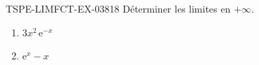 \begin{exercice}{TSPE-LIMFCT-EX-038}{1}{8}
Déterminer les limites en $+\infty$.
\begin{enumerate}
  \item $3x^2\,\mathrm{e}^{-x}$
  \item $\mathrm{e}^x - x$
\end{enumerate}
\end{exercice}
